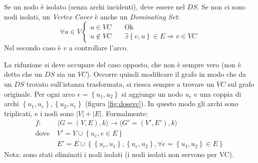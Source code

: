 Se un nodo è isolato (senza archi incidenti), deve essere nel $DS$.
Se non ci sono nodi isolati, un \emph{Vertex Cover} è anche un \emph{Dominating Set}:
\begin{equation*}
    \forall u \in V
    \begin{cases}
        u \in VC \quad & \text{Ok}
        \\
        u \notin VC \quad &
        \exists \left\{ v,u \right\} \in E
        \Rightarrow v \in VC
    \end{cases}
\end{equation*}
Nel secondo caso è $v$ a controllare l'arco.

La riduzione si deve occupare del caso opposto, che non è sempre vero (non è detto che un $DS$ sia un $VC$). Occorre quindi modificare il grafo in modo che da un $DS$ trovato sull'istanza trasformata, si riesca sempre a trovare un $VC$ sul grafo originale.
Per ogni arco $
    e = \left\{ u_1, u_2 \right\}
$
si aggiunge un nodo $u_e$ e una coppia di archi $
\left\{ u_1, u_e \right\}, 
\left\{ u_2, u_e \right\}
$ (figura \ref{fig:dosevc}).
In questo modo gli archi sono triplicati, e i nodi sono $|V|+|E|$.
Formalmente:
\begin{align*}
    f
    :
    &
    \;
    \langle
    G = \left( V,E \right), k
    \rangle
    \to
    \langle
    G' = \left( V',E' \right), k
    \rangle
    \\
    \text{dove}
    &
    \;
    V' = V \cup \left\{ u_e, e \in E \right\}
    \\
    &
    \;
    E' = E \cup
    \left\{ 
        \left\{ u_e, u_1 \right\}, \left\{ u_e, u_2 \right\},
        \forall e = \left\{ u_1, u_2 \right\} \in E
    \right\}
\end{align*}
Nota: sono stati eliminati i nodi isolati
(i nodi isolati non servono per VC).

